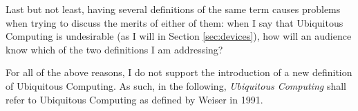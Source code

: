 Last but not least, having several definitions of the same term causes problems when trying to discuss the merits of either of them: when I say
that Ubiquitous Computing is undesirable (as I will in Section \ref{sec:devices}), how will
an audience know which of the two definitions I am addressing?

For all of the above reasons, I do not support the introduction of a new definition of Ubiquitous Computing. As such, in the following,
\emph{Ubiquitous Computing} shall refer to Ubiquitous Computing as defined by Weiser in 1991.